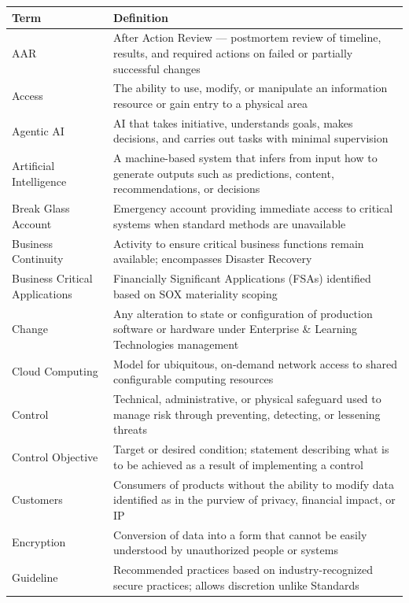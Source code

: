 \documentclass[11pt,landscape]{article}
\begin{document}
\begin{longtable}{|p{3.5cm}|p{6in}|}
\hline
\rowcolor{headgray} \textbf{Term} & \textbf{Definition} \\
\hline
AAR & After Action Review --- postmortem review of timeline, results, and required actions on failed or partially successful changes \\
\hline
Access & The ability to use, modify, or manipulate an information resource or gain entry to a physical area \\
\hline
Agentic AI & AI that takes initiative, understands goals, makes decisions, and carries out tasks with minimal supervision \\
\hline
Artificial Intelligence & A machine-based system that infers from input how to generate outputs such as predictions, content, recommendations, or decisions \\
\hline
Break Glass Account & Emergency account providing immediate access to critical systems when standard methods are unavailable \\
\hline
Business Continuity & Activity to ensure critical business functions remain available; encompasses Disaster Recovery \\
\hline
Business Critical Applications & Financially Significant Applications (FSAs) identified based on SOX materiality scoping \\
\hline
Change & Any alteration to state or configuration of production software or hardware under Enterprise \& Learning Technologies management \\
\hline
Cloud Computing & Model for ubiquitous, on-demand network access to shared configurable computing resources \\
\hline
Control & Technical, administrative, or physical safeguard used to manage risk through preventing, detecting, or lessening threats \\
\hline
Control Objective & Target or desired condition; statement describing what is to be achieved as a result of implementing a control \\
\hline
Customers & Consumers of products without the ability to modify data identified as in the purview of privacy, financial impact, or IP \\
\hline
Encryption & Conversion of data into a form that cannot be easily understood by unauthorized people or systems \\
\hline
Guideline & Recommended practices based on industry-recognized secure practices; allows discretion unlike Standards \\

\end{longtable}
\end{document}
